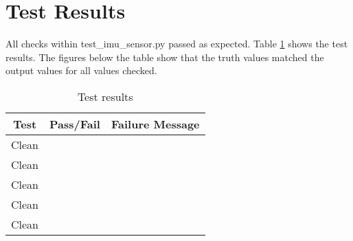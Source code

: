 \section{Test Results}
All checks within test\_imu\_sensor.py passed as expected. Table \ref{tab:results} shows the test results. The figures below the table show that the truth values matched the output values for all values checked.

\begin{table}[H]
	\caption{Test results}
	\label{tab:results}
	\centering \fontsize{10}{10}\selectfont
	\begin{tabular}{c | c | c  } %
		\hline
		\textbf{Test} 						  		&\textbf{Pass/Fail} &		\textbf{Failure Message}										\\ \hline
		Clean	   			& &    		 \\ \hline
		Clean	   			& &     		 \\ \hline
		Clean	   			& &   		 \\ \hline
		Clean	   			& &   		 \\ \hline
		Clean	   			& &     		 \\ \hline
	\end{tabular}
\end{table}






























	

\pagebreak %